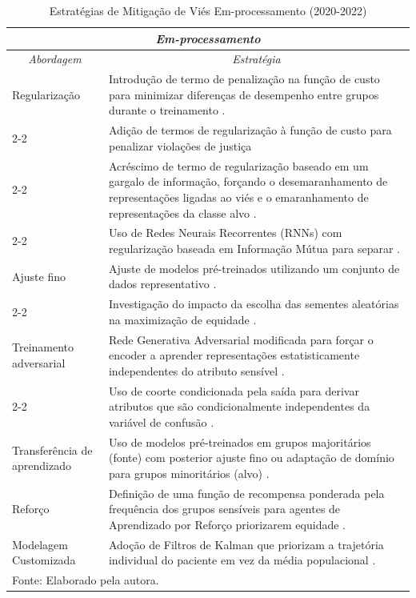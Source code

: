 \newpage


\begin{longtable}{p{2.5cm}|p{11.5cm}}%
\caption{Estratégias de Mitigação de Viés Em-processamento (2020-2022)} \label{tab:mitigacao_in} \\
\hline
\multicolumn{2}{c}{\textit{Em-processamento}} \\ \hline
\hline
\multicolumn{1}{c|}{\textit{Abordagem}} & \multicolumn{1}{c}{\textit{Estratégia}} %
\\ \hline
Regularização &
Introdução de termo de penalização na função de custo para minimizar diferenças de desempenho entre grupos durante o treinamento \cite{alday2022age}. \\
\cline{2-2}
& Adição de termos de regularização à função de custo para penalizar violações de justiça \cite{pfohl2021empirical} \\
\cline{2-2}
& Acréscimo de termo de regularização baseado em um gargalo de informação, forçando o desemaranhamento de representações ligadas ao viés e o emaranhamento de representações da classe alvo \cite{tartaglione2021end}. \\
\cline{2-2}
& Uso de Redes Neurais Recorrentes (RNNs) com regularização baseada em Informação Mútua para separar %
\cite{chu2022disentangled}. \\
\hline
Ajuste fino & Ajuste de modelos pré-treinados utilizando um conjunto de dados representativo \cite{daneshjou2022disparities}. \\
\cline{2-2}
& Investigação do impacto da escolha das sementes aleatórias na maximização de equidade \cite{amir2021impact}. \\
\hline
Treinamento adversarial & Rede Generativa Adversarial modificada para forçar o encoder a aprender representações estatisticamente independentes do atributo sensível \cite{adeli2021representation}. \\
\cline{2-2}
& Uso de coorte condicionada pela saída para derivar atributos que são condicionalmente independentes da variável de confusão \cite{zhao2020training}. \\
\hline
Transferência de aprendizado & Uso de modelos pré-treinados em grupos majoritários (fonte) com posterior ajuste fino ou adaptação de domínio para grupos minoritários (alvo) \cite{gao2020deep}. \\
\hline
Reforço &
Definição de uma função de recompensa ponderada pela frequência dos grupos sensíveis para agentes de Aprendizado por Reforço priorizarem equidade
\cite{yang2022algorithmic}.
\\ \hline
Modelagem Customizada &
Adoção de Filtros de Kalman que priorizam a trajetória individual do paciente em vez da média populacional \cite{zhalechian2022augmenting}. \\
\hline
\multicolumn{2}{l}{\small Fonte: Elaborado pela autora.} \\ %
\end{longtable}


